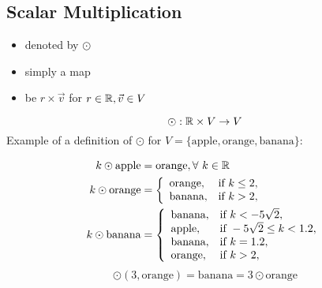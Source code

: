 \subsection*{Scalar Multiplication}
\begin{itemize}
  \item denoted by $\odot$
  \item simply a map
  \item {} be $r \times \vec{v}$ for $r \in \mathbb{R}, \vec{v} \in V$
\end{itemize}
\[
  \odot: \mathbb{R} \times V \rightarrow V
\]
Example of a definition of $\odot$ for $V=\{\text{apple}, \text{orange}, \text{banana}\}$:
\begin{center}
  \begin{align*}
    k \odot \text{apple}  & = \text{orange}, \forall~ k \in \mathbb{R} \\
    k \odot \text{orange} & = \left\{
    \begin{array}{lr}
      \text{orange}, & \text{if}~k \leq 2, \\
      \text{banana}, & \text{if}~k > 2,    \\
    \end{array} \right.                          \\
    k \odot \text{banana} & = \left\{
    \begin{array}{ll}
      \text{banana}, & \text{if}~k < -5\sqrt{2},          \\
      \text{apple},  & \text{if}~-5\sqrt{2} \leq k < 1.2, \\
      \text{banana}, & \text{if}~k = 1.2,                 \\
      \text{orange}, & \text{if}~k > 2,                   \\
    \end{array}
    \right.
  \end{align*}
  \[
    \odot(3, \text{orange}) = \text{banana} = 3 \odot \text{orange}
  \]
\end{center}

